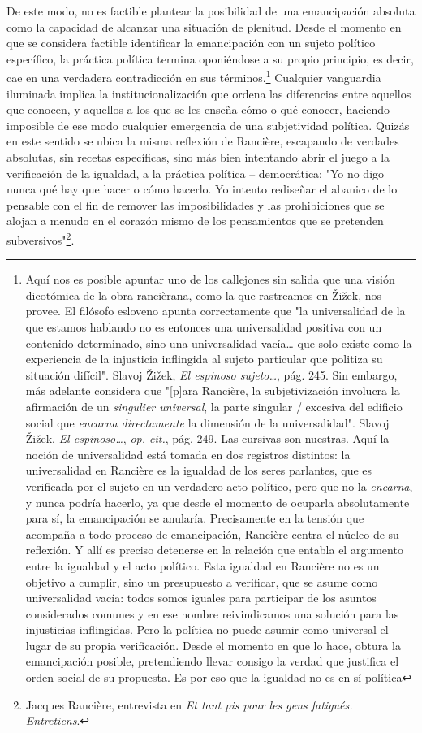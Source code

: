 De este modo, no es factible plantear la posibilidad de una emancipación
absoluta como la capacidad de alcanzar una situación de plenitud. Desde
el momento en que se considera factible identificar la emancipación con
un sujeto político específico, la práctica política termina oponiéndose
a su propio principio, es decir, cae en una verdadera contradicción en
sus términos.\footnote{Aquí nos es posible apuntar uno de los callejones
  sin salida que una visión dicotómica de la obra rancièrana, como la
  que rastreamos en Žižek, nos provee. El filósofo esloveno apunta
  correctamente que "la universalidad de la que estamos hablando no es
  entonces una universalidad positiva con un contenido determinado, sino
  una universalidad vacía\ldots{} que solo existe como la experiencia de
  la injusticia inflingida al sujeto particular que politiza su
  situación difícil". Slavoj Žižek, \emph{El espinoso sujeto\ldots{}},
  pág. 245. Sin embargo, más adelante considera que "{[}p{]}ara
  Rancière, la subjetivización involucra la afirmación de un
  \emph{singulier universal}, la parte singular / excesiva del edificio
  social que \emph{encarna directamente} la dimensión de la
  universalidad". Slavoj Žižek, \emph{El espinoso\ldots{}}, \emph{op.
  cit.}, pág. 249. Las cursivas son nuestras. Aquí la noción de
  universalidad está tomada en dos registros distintos: la universalidad
  en Rancière es la igualdad de los seres parlantes, que es verificada
  por el sujeto en un verdadero acto político, pero que no la
  \emph{encarna}, y nunca podría hacerlo, ya que desde el momento de
  ocuparla absolutamente para sí, la emancipación se anularía.
  Precisamente en la tensión que acompaña a todo proceso de
  emancipación, Rancière centra el núcleo de su reflexión. Y allí es
  preciso detenerse en la relación que entabla el argumento entre la
  igualdad y el acto político. Esta igualdad en Rancière no es un
  objetivo a cumplir, sino un presupuesto a verificar, que se asume como
  universalidad vacía: todos somos iguales para participar de los
  asuntos considerados comunes y en ese nombre reivindicamos una
  solución para las injusticias inflingidas. Pero la política no puede
  asumir como universal el lugar de su propia verificación. Desde el
  momento en que lo hace, obtura la emancipación posible, pretendiendo
  llevar consigo la verdad que justifica el orden social de su
  propuesta. Es por eso que la igualdad no es en sí política} Cualquier
vanguardia iluminada implica la institucionalización que ordena las
diferencias entre aquellos que conocen, y aquellos a los que se les
enseña cómo o qué conocer, haciendo imposible de ese modo cualquier
emergencia de una subjetividad política. Quizás en este sentido se ubica
la misma reflexión de Rancière, escapando de verdades absolutas, sin
recetas específicas, sino más bien intentando abrir el juego a la
verificación de la igualdad, a la práctica política -- democrática: "Yo
no digo nunca qué hay que hacer o cómo hacerlo. Yo intento rediseñar el
abanico de lo pensable con el fin de remover las imposibilidades y las
prohibiciones que se alojan a menudo en el corazón mismo de los
pensamientos que se pretenden subversivos"\footnote{Jacques Rancière,
  entrevista en \emph{Et tant pis pour les gens fatigués. Entretiens}.}.

